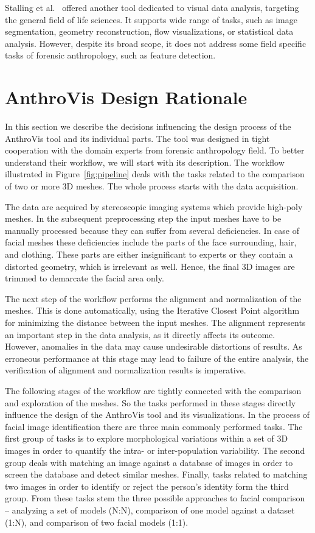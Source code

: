 \documentclass[final,5p,times]{elsarticle}
\begin{document}
Stalling et al.~\cite{stalling200538} offered another tool dedicated to visual data analysis, targeting the general field of life sciences. 
It supports wide range of tasks, such as image segmentation, geometry reconstruction, flow visualizations, or statistical data analysis.
However, despite its broad scope, it does not address some field specific tasks of forensic anthropology, such as feature detection.

\section{AnthroVis Design Rationale} \label{overview}
In this section we describe the decisions influencing the design process of the AnthroVis tool and its individual parts.
The tool was designed in tight cooperation with the domain experts from forensic anthropology field.
To better understand their workflow, we will start with its description.
The workflow illustrated in Figure~\ref{fig:pipeline} deals with the tasks related to the comparison of two or more 3D meshes.
The whole process starts with the data acquisition.

The data are acquired by stereoscopic imaging systems which provide high-poly meshes. 
In the subsequent preprocessing step the input meshes have to be manually processed because they can suffer from several deficiencies. 
In case of facial meshes these deficiencies include the parts of the face surrounding, hair, and clothing.
These parts are either insignificant to experts or they contain a distorted geometry, which is irrelevant as well. 
Hence, the final 3D images are trimmed to demarcate the facial area only.

The next step of the workflow performs the alignment and normalization of the meshes. 
This is done automatically, using the Iterative Closest Point algorithm~\cite{besl1992method} for minimizing the distance between the input meshes.
The alignment represents an important step in the data analysis, as it directly affects its outcome.
However, anomalies in the data may cause undesirable distortions of results. 
As erroneous performance at this stage may lead to failure of the entire analysis, the verification of alignment and normalization results is imperative.

The following stages of the workflow are tightly connected with the comparison and exploration of the meshes.
So the tasks performed in these stages directly influence the design of the AnthroVis tool and its visualizations.
In the process of facial image identification there are three main commonly performed tasks.
The first group of tasks is to explore morphological variations within a set of 3D images in order to quantify the intra- or inter-population variability.
The second group deals with matching an image against a database of images in order to screen the database and detect similar meshes.
Finally, tasks related to matching two images in order to identify or reject the person's identity form the third group.
From these tasks stem the three possible approaches to facial comparison -- analyzing a set of models (N:N), comparison of one model against a dataset (1:N), and comparison of two facial models (1:1). 
\end{document}
